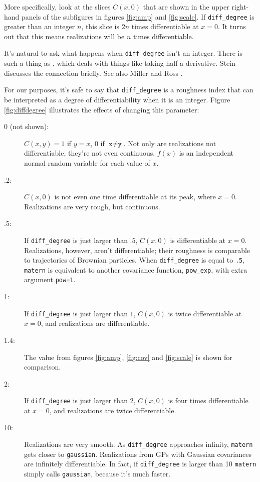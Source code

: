 More specifically, look at the slices $C(x,0)$ that are shown in the upper right-hand panels of the subfigures in figures \ref{fig:amp} and \ref{fig:scale}. If \texttt{diff_degree} is greater than an integer $n$, this slice is $2n$ times differentiable at $x=0$. It turns out that this means realizations will be $n$ times differentiable.

It's natural to ask what happens when \texttt{diff_degree} isn't an integer. There is such a thing as , which deals with things like taking half a derivative. Stein \cite{stein} discusses the connection briefly. See also Miller and Ross \cite{fraccalc}.

For our purposes, it's safe to say that \texttt{diff_degree} is a roughness index that can be interpreted as a degree of differentiability when it is an integer. Figure \ref{fig:diffdegree} illustrates the effects of changing this parameter:
\begin{description}
    \item[0 (not shown):] $C(x,y)=1$ if $y=x$, $0$ if $\texttt{x}\ne \texttt{y}$. Not only are realizations not differentiable, they're not even continuous. $f(x)$ is an independent normal random variable for each value of $x$.
    \item[.2:] $C(x,0)$ is not even one time differentiable at its peak, where $x=0$. Realizations are very rough, but continuous.
    \item[.5:] If \texttt{diff_degree} is just larger than $.5$, $C(x,0)$ is differentiable at $x=0$. Realizations, however, aren't differentiable; their roughness is comparable to trajectories of Brownian particles. When \texttt{diff_degree} is equal to \texttt{.5}, \texttt{matern} is equivalent to another covariance function, \texttt{pow_exp}, with extra argument \texttt{pow=1}.
    \item[1:] If \texttt{diff_degree} is just larger than $1$, $C(x,0)$ is twice differentiable at $x=0$, and realizations are differentiable.
    \item[1.4:] The value from figures \ref{fig:amp}, \ref{fig:cov} and \ref{fig:scale} is shown for comparison.
    \item[2:] If \texttt{diff_degree} is just larger than $2$, $C(x,0)$ is four times differentiable at $x=0$, and realizations are twice differentiable.
    \item[10:] Realizations are very smooth. As \texttt{diff_degree} approaches infinity, \texttt{matern} gets closer to \texttt{gaussian}. Realizations from GPs with Gaussian covariances are infinitely differentiable. In fact, if \texttt{diff_degree} is larger than 10 \texttt{matern} simply calls \texttt{gaussian}, because it's much faster. 
\end{description}


